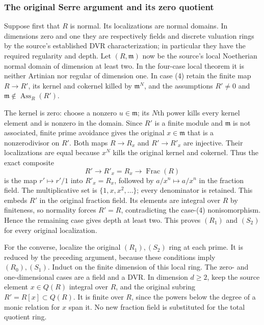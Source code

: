 \subsubsection{The original Serre argument and its zero quotient}\label{the-original-serre-argument-and-its-zero-quotient}

Suppose first that \(R\) is normal. Its localizations are normal domains. In dimensions zero and one they are respectively fields and discrete valuation rings by the source's established DVR characterization; in particular they have the required regularity and depth. Let \((R,\mathfrak m)\) now be the source's local Noetherian normal domain of dimension at least two. In the four-case local theorem it is neither Artinian nor regular of dimension one. In case (4) retain the finite map \(R\to R'\), its kernel and cokernel killed by \(\mathfrak m^N\), and the assumptions \(R'\ne0\) and \(\mathfrak m\notin\operatorname{Ass}_R(R')\).

The kernel is zero: choose a nonzero \(u\in\mathfrak m\); its \(N\)th power kills every kernel element and is nonzero in the domain. Since \(R'\) is a finite module and \(\mathfrak m\) is not associated, finite prime avoidance gives the original \(x\in\mathfrak m\) that is a nonzerodivisor on \(R'\). Both maps \(R\to R_x\) and \(R'\to R'_x\) are injective. Their localizations are equal because \(x^N\) kills the original kernel and cokernel. Thus the exact composite \[
 R'\longrightarrow R'_x=R_x
 \longrightarrow\operatorname{Frac}(R)
\] is the map \(r'\mapsto r'/1\) into \(R'_x=R_x\), followed by \(a/x^n\mapsto a/x^n\) in the fraction field. The multiplicative set is \(\{1,x,x^2,\ldots\}\); every denominator is retained. This embeds \(R'\) in the original fraction field. Its elements are integral over \(R\) by finiteness, so normality forces \(R'=R\), contradicting the case-(4) nonisomorphism. Hence the remaining case gives depth at least two. This proves \((R_1)\) and \((S_2)\) for every original localization.

For the converse, localize the original \((R_1),(S_2)\) ring at each prime. It is reduced by the preceding argument, because these conditions imply \((R_0),(S_1)\). Induct on the finite dimension of this local ring. The zero- and one-dimensional cases are a field and a DVR. In dimension \(d\geq2\), keep the source element \(x\in Q(R)\) integral over \(R\), and the original subring \(R'=R[x]\subset Q(R)\). It is finite over \(R\), since the powers below the degree of a monic relation for \(x\) span it. No new fraction field is substituted for the total quotient ring.

